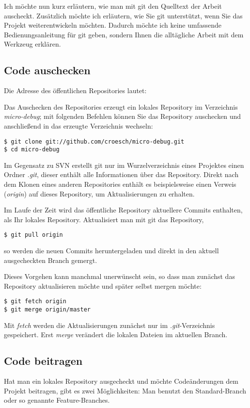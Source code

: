 Ich möchte nun kurz erläutern, wie man mit \gls{git} den Quelltext der Arbeit auscheckt. Zusätzlich möchte ich erläutern, wie Sie \gls{git} unterstützt, wenn Sie das Projekt weiterentwickeln möchten. Dadurch möchte ich keine umfassende Bedienungsanleitung für \gls{git} geben, sondern Ihnen die alltägliche Arbeit mit dem Werkzeug erklären.

\subsection{Code auschecken}
\label{sec:git-checkout}
Die Adresse des öffentlichen Repositories %
lautet:

Das Auschecken des Repositories %
erzeugt ein lokales Repository im Verzeichnis \emph{micro-debug}; mit folgenden Befehlen können Sie das Repository auschecken und anschließend in das erzeugte Verzeichnis wechseln:
\begin{verbatim}
$ git clone git://github.com/croesch/micro-debug.git
$ cd micro-debug
\end{verbatim}

Im Gegensatz zu SVN %
erstellt \gls{git} nur im Wurzelverzeichnis eines Projektes einen Ordner \emph{.git}, dieser enthält alle Informationen über das Repository. Direkt nach dem Klonen eines anderen Repositories enthält es beispielsweise einen Verweis (\emph{origin}) auf dieses Repository, um Aktualisierungen zu erhalten.

Im Laufe der Zeit wird das öffentliche Repository aktuellere Commits enthalten, als Ihr lokales Repository. Aktualisiert man mit \gls{git} das Repository,
\begin{verbatim}
$ git pull origin
\end{verbatim}
so werden die neuen Commits heruntergeladen und direkt in den aktuell ausgecheckten Branch gemergt. %

Dieses Vorgehen kann manchmal unerwünscht sein, so dass man zunächst das Repository aktualisieren möchte und später selbst mergen möchte:
\begin{verbatim}
$ git fetch origin
$ git merge origin/master
\end{verbatim}
Mit \emph{fetch} werden die Aktualisierungen zunächst nur im \emph{.git}-Verzeichnis gespeichert. Erst \emph{merge} verändert die lokalen Dateien im aktuellen Branch.

\subsection{Code beitragen}
Hat man ein lokales Repository ausgecheckt und möchte Codeänderungen dem Projekt beitragen, gibt es zwei Möglichkeiten: Man benutzt den Standard-Branch oder so genannte Feature-Branches.

